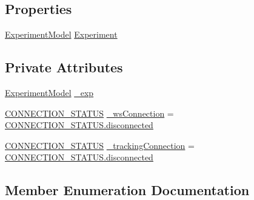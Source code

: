 \subsection*{Properties}
\begin{DoxyCompactItemize}
\item 
\hyperlink{class_web_analyzer_1_1_models_1_1_base_1_1_experiment_model}{Experiment\+Model} \hyperlink{class_web_analyzer_1_1_u_i_1_1_interaction_objects_1_1_experiment_object_a2b87e06b55663703f1017c95c19bfa29}{Experiment}
\end{DoxyCompactItemize}
\subsection*{Private Attributes}
\begin{DoxyCompactItemize}
\item 
\hyperlink{class_web_analyzer_1_1_models_1_1_base_1_1_experiment_model}{Experiment\+Model} \hyperlink{class_web_analyzer_1_1_u_i_1_1_interaction_objects_1_1_experiment_object_a8275ff9c2a3971c6250a462e7e248843}{\+\_\+exp}
\item 
\hyperlink{class_web_analyzer_1_1_u_i_1_1_interaction_objects_1_1_experiment_object_a2875208b4f4b0ed643593152f4ec025c}{C\+O\+N\+N\+E\+C\+T\+I\+O\+N\+\_\+\+S\+T\+A\+T\+U\+S} \hyperlink{class_web_analyzer_1_1_u_i_1_1_interaction_objects_1_1_experiment_object_a37bc6281799039ec5d51c400ddb07ca0}{\+\_\+ws\+Connection} = \hyperlink{class_web_analyzer_1_1_u_i_1_1_interaction_objects_1_1_experiment_object_a2875208b4f4b0ed643593152f4ec025ca3a561116f0c9675a3c83d21fa365050d}{C\+O\+N\+N\+E\+C\+T\+I\+O\+N\+\_\+\+S\+T\+A\+T\+U\+S.\+disconnected}
\item 
\hyperlink{class_web_analyzer_1_1_u_i_1_1_interaction_objects_1_1_experiment_object_a2875208b4f4b0ed643593152f4ec025c}{C\+O\+N\+N\+E\+C\+T\+I\+O\+N\+\_\+\+S\+T\+A\+T\+U\+S} \hyperlink{class_web_analyzer_1_1_u_i_1_1_interaction_objects_1_1_experiment_object_a7cb71354914a07dab1f19146216aa777}{\+\_\+tracking\+Connection} = \hyperlink{class_web_analyzer_1_1_u_i_1_1_interaction_objects_1_1_experiment_object_a2875208b4f4b0ed643593152f4ec025ca3a561116f0c9675a3c83d21fa365050d}{C\+O\+N\+N\+E\+C\+T\+I\+O\+N\+\_\+\+S\+T\+A\+T\+U\+S.\+disconnected}
\end{DoxyCompactItemize}


\subsection{Member Enumeration Documentation}
\hypertarget{class_web_analyzer_1_1_u_i_1_1_interaction_objects_1_1_experiment_object_a2875208b4f4b0ed643593152f4ec025c}{}
